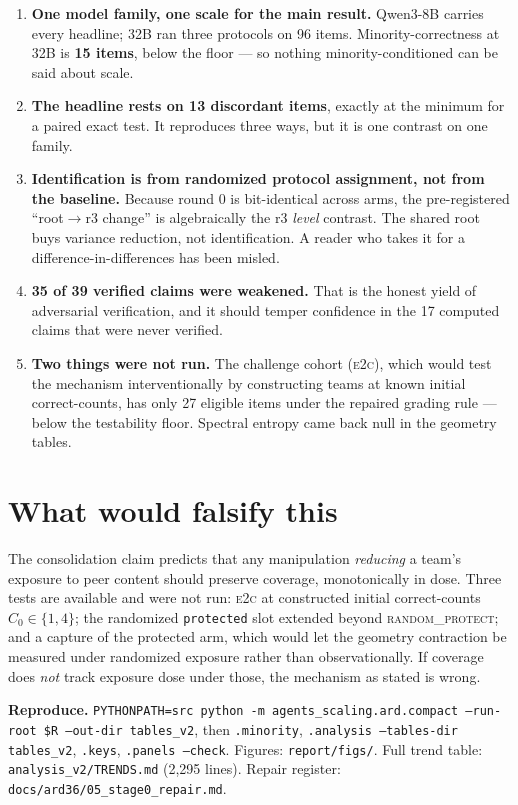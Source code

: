 \documentclass[11pt]{article}
\begin{document}
\begin{enumerate}[leftmargin=1.4em]
\item \textbf{One model family, one scale for the main result.} Qwen3-8B carries every headline;
32B ran three protocols on 96 items. Minority-correctness at 32B is \textbf{15 items}, below the
floor --- so nothing minority-conditioned can be said about scale.
\item \textbf{The headline rests on 13 discordant items}, exactly at the minimum for a paired exact
test. It reproduces three ways, but it is one contrast on one family.
\item \textbf{Identification is from randomized protocol assignment, not from the baseline.} Because
round 0 is bit-identical across arms, the pre-registered ``root$\rightarrow$r3 change'' is
algebraically the r3 \emph{level} contrast. The shared root buys variance reduction, not
identification. A reader who takes it for a difference-in-differences has been misled.
\item \textbf{35 of 39 verified claims were weakened.} That is the honest yield of adversarial
verification, and it should temper confidence in the 17 computed claims that were never verified.
\item \textbf{Two things were not run.} The challenge cohort (\textsc{e2c}), which would test the
mechanism interventionally by constructing teams at known initial correct-counts, has only 27
eligible items under the repaired grading rule --- below the testability floor. Spectral entropy
came back null in the geometry tables.
\end{enumerate}

\section{What would falsify this}

The consolidation claim predicts that any manipulation \emph{reducing} a team's exposure to peer
content should preserve coverage, monotonically in dose. Three tests are available and were not run:
\textsc{e2c} at constructed initial correct-counts $C_0 \in \{1,4\}$; the randomized
\texttt{protected} slot extended beyond \textsc{random\_protect}; and a capture of the protected
arm, which would let the geometry contraction be measured under randomized exposure rather than
observationally. If coverage does \emph{not} track exposure dose under those, the mechanism as
stated is wrong.

\vfill
\begin{plainbox}\small
\textbf{Reproduce.} \texttt{PYTHONPATH=src python -m agents\_scaling.ard.compact --run-root \$R
--out-dir tables\_v2}, then \texttt{.minority}, \texttt{.analysis --tables-dir tables\_v2},
\texttt{.keys}, \texttt{.panels --check}. Figures: \texttt{report/figs/}. Full trend table:
\texttt{analysis\_v2/TRENDS.md} (2{,}295 lines). Repair register:
\texttt{docs/ard36/05\_stage0\_repair.md}.
\end{plainbox}
\end{document}
